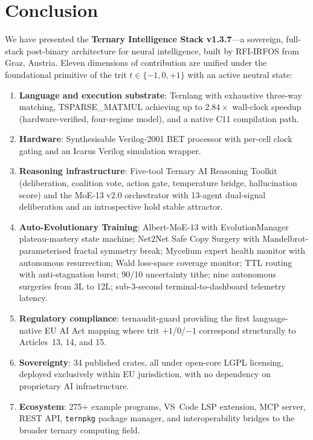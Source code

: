 \documentclass[journal,10pt,twocolumn]{IEEEtran}
\begin{document}
\section{Conclusion}
\label{sec:conclusion}

We have presented the \textbf{Ternary Intelligence Stack v1.3.7}---a
sovereign, full-stack post-binary architecture for neural intelligence,
built by RFI-IRFOS from Graz, Austria. Eleven dimensions of contribution
are unified under the foundational primitive of the trit $t \in \{-1,0,+1\}$
with an active neutral state:

\begin{enumerate}
  \item \textbf{Language and execution substrate}: Ternlang with exhaustive
        three-way matching, TSPARSE\_MATMUL achieving up to $2.84\times$
        wall-clock speedup (hardware-verified, four-regime model), and a
        native C11 compilation path.

  \item \textbf{Hardware}: Synthesisable Verilog-2001 BET processor with
        per-cell clock gating and an Icarus Verilog simulation wrapper.

  \item \textbf{Reasoning infrastructure}: Five-tool Ternary AI Reasoning
        Toolkit (deliberation, coalition vote, action gate, temperature
        bridge, hallucination score) and the MoE-13 v2.0 orchestrator with
        13-agent dual-signal deliberation and an introspective hold stable
        attractor.

  \item \textbf{Auto-Evolutionary Training}: Albert-MoE-13 with
        EvolutionManager plateau-mastery state machine; Net2Net Safe Copy
        Surgery with Mandelbrot-parameterised fractal symmetry break;
        Mycelium expert health monitor with autonomous resurrection;
        Wald loss-space coverage monitor; TTL routing with anti-stagnation
        burst; 90/10 uncertainty tithe; nine autonomous surgeries from 3L
        to 12L; sub-3-second terminal-to-dashboard telemetry latency.

  \item \textbf{Regulatory compliance}: ternaudit-guard providing the first
        language-native EU AI Act mapping where trit $+1$/0/$-1$ correspond
        structurally to Articles~13, 14, and 15.

  \item \textbf{Sovereignty}: 34 published crates, all under open-core LGPL
        licensing, deployed exclusively within EU jurisdiction, with no
        dependency on proprietary AI infrastructure.

  \item \textbf{Ecosystem}: 275+ example programs, VS~Code LSP extension,
        MCP server, REST API, \texttt{ternpkg} package manager, and
        interoperability bridges to the broader ternary computing field.
\end{enumerate}
\end{document}
